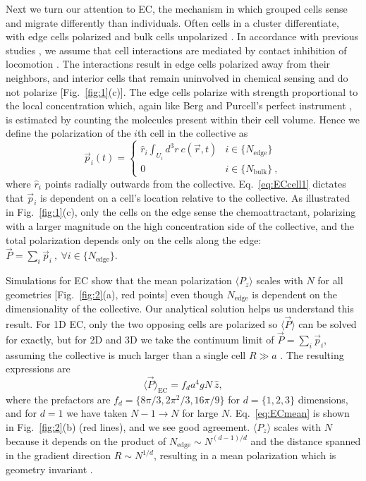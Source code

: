 Next we turn our attention to EC, the mechanism in which grouped cells sense and migrate differently than individuals.
Often cells in a cluster differentiate, with edge cells polarized and bulk cells unpolarized \cite{malet2015collective,cai2016modeling}. In accordance with previous studies \cite{camley2016emergent,varennes2016collective},
we assume that cell interactions are mediated by contact inhibition of locomotion \cite{mayor2010keeping}. The interactions result in edge cells polarized away from their neighbors, and interior cells that remain uninvolved in chemical sensing and do not polarize [Fig.\ \ref{fig:1}(c)]. The edge cells polarize with strength proportional to the local concentration which, again like Berg and Purcell's perfect instrument \cite{berg1977physics}, is estimated by counting the molecules present within their cell volume. Hence we define the polarization of the $i$th cell in the collective as
\begin{equation} \label{eq:ECcell1}
    \vec{p}_i(t) =
    \begin{cases}
         \hat{r}_i \int_{U_i} d^3r \ c(\vec{r},t) &i \in \{ N_\text{edge} \} \\
        0 &i \in \{ N_\text{bulk} \} \ ,
    \end{cases}
\end{equation}
where $\hat{r}_i$ points radially outwards from the collective. Eq.\ \ref{eq:ECcell1} dictates that $\vec{p}_i$ is dependent on a cell's location relative to the collective. As illustrated in Fig.\ \ref{fig:1}(c), only the cells on the edge sense the chemoattractant, polarizing with a larger magnitude on the high concentration side of the collective, and the total polarization depends only on the cells along the edge:
$\vec{P} = \sum_i \vec{p}_i \ , \ \forall i \in \{N_\text{edge}\}$.

Simulations for EC show that the mean polarization $\langle P_z \rangle$ scales with $N$ for all geometries [Fig.\ \ref{fig:2}(a), red points] even though $N_\text{edge}$ is dependent on the dimensionality of the collective. Our analytical solution helps us understand this result. For 1D EC, only the two opposing cells are polarized so $\langle\vec{P}\rangle$ can be solved for exactly, but for 2D and 3D we take the continuum limit of
$\vec{P} = \sum_i \vec{p}_i$,
assuming the collective is much larger than a single cell $R \gg a$ \cite{supinfo}. The resulting expressions are
\begin{equation} \label{eq:ECmean}
    \langle \vec{P} \rangle_\text{EC} = f_d a^4gN \ \hat{z},
\end{equation}
where the prefactors are $f_d = \{8\pi/3, 2\pi^2/3, 16\pi/9\}$ for $d=\{1,2,3\}$ dimensions, and for $d=1$ we have taken $N-1\to N$ for large $N$. Eq.\ \ref{eq:ECmean} is shown in Fig.\ \ref{fig:2}(b) (red lines), and we see good agreement. $\langle P_z \rangle$ scales with $N$ because it depends on the product of
$N_\text{edge} \sim N^{(d-1)/d}$
and the distance spanned in the gradient direction
$R \sim N^{1/d}$,
resulting in a mean polarization which is geometry invariant \cite{malet2015collective}.

